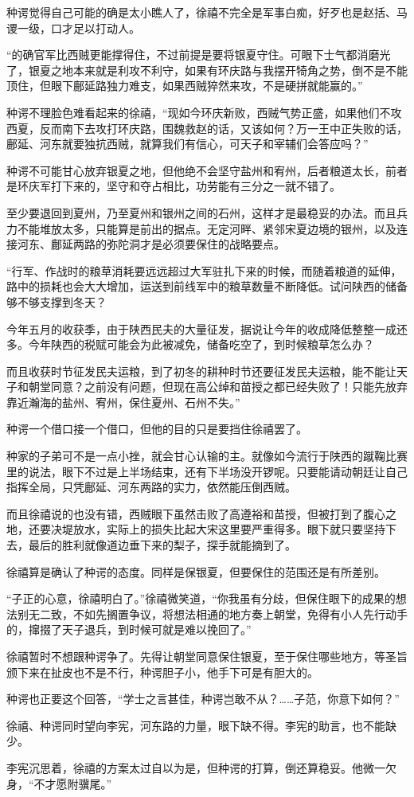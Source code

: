 种谔觉得自己可能的确是太小瞧人了，徐禧不完全是军事白痴，好歹也是赵括、马谡一级，口才足以打动人。

“的确官军比西贼更能撑得住，不过前提是要将银夏守住。可眼下士气都消磨光了，银夏之地本来就是利攻不利守，如果有环庆路与我摆开犄角之势，倒不是不能顶住，但眼下鄜延路独力难支，如果西贼猝然来攻，不是硬拼就能赢的。”

种谔不理脸色难看起来的徐禧，“现如今环庆新败，西贼气势正盛，如果他们不攻西夏，反而南下去攻打环庆路，围魏救赵的话，又该如何？万一王中正失败的话，鄜延、河东就要独抗西贼，就算我们有信心，可天子和宰辅们会答应吗？”

种谔不可能甘心放弃银夏之地，但他绝不会坚守盐州和宥州，后者粮道太长，前者是环庆军打下来的，坚守和夺占相比，功劳能有三分之一就不错了。

至少要退回到夏州，乃至夏州和银州之间的石州，这样才是最稳妥的办法。而且兵力不能堆放太多，只能算是前出的据点。无定河畔、紧邻宋夏边境的银州，以及连接河东、鄜延两路的弥陀洞才是必须要保住的战略要点。

“行军、作战时的粮草消耗要远远超过大军驻扎下来的时候，而随着粮道的延伸，路中的损耗也会大大增加，运送到前线军中的粮草数量不断降低。试问陕西的储备够不够支撑到冬天？

今年五月的收获季，由于陕西民夫的大量征发，据说让今年的收成降低整整一成还多。今年陕西的税赋可能会为此被减免，储备吃空了，到时候粮草怎么办？

而且收获时节征发民夫运粮，到了初冬的耕种时节还要征发民夫运粮，能不能让天子和朝堂同意？之前没有问题，但现在高公绰和苗授之都已经失败了！只能先放弃靠近瀚海的盐州、宥州，保住夏州、石州不失。”

种谔一个借口接一个借口，但他的目的只是要挡住徐禧罢了。

种家的子弟可不是一点小挫，就会甘心认输的主。就像如今流行于陕西的蹴鞠比赛里的说法，眼下不过是上半场结束，还有下半场没开锣呢。只要能请动朝廷让自己指挥全局，只凭鄜延、河东两路的实力，依然能压倒西贼。

而且徐禧说的也没有错，西贼眼下虽然击败了高遵裕和苗授，但被打到了腹心之地，还要决堤放水，实际上的损失比起大宋这里要严重得多。眼下就只要坚持下去，最后的胜利就像道边垂下来的梨子，探手就能摘到了。

徐禧算是确认了种谔的态度。同样是保银夏，但要保住的范围还是有所差别。

“子正的心意，徐禧明白了。”徐禧微笑道，“你我虽有分歧，但保住眼下的成果的想法别无二致，不如先搁置争议，将想法相通的地方奏上朝堂，免得有小人先行动手的，撺掇了天子退兵，到时候可就是难以挽回了。”

徐禧暂时不想跟种谔争了。先得让朝堂同意保住银夏，至于保住哪些地方，等圣旨颁下来在扯皮也不是不行，种谔胆子小，他手下可是有胆大的。

种谔也正要这个回答，“学士之言甚佳，种谔岂敢不从？……子范，你意下如何？”

徐禧、种谔同时望向李宪，河东路的力量，眼下缺不得。李宪的助言，也不能缺少。

李宪沉思着，徐禧的方案太过自以为是，但种谔的打算，倒还算稳妥。他微一欠身，“不才愿附骥尾。”

